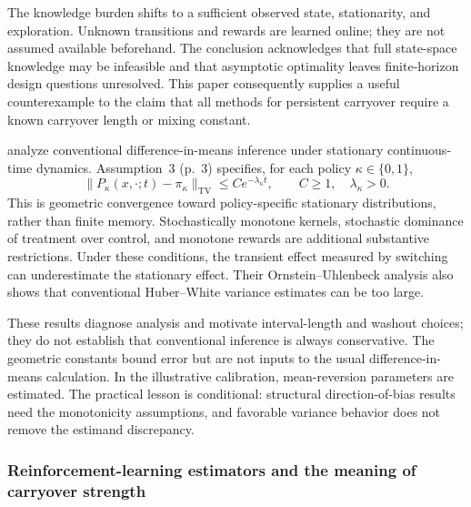 \documentclass[12pt]{article}
\begin{document}
The knowledge burden shifts to a sufficient observed state, stationarity, and exploration. Unknown transitions and rewards are learned online; they are not assumed available beforehand. The conclusion acknowledges that full state-space knowledge may be infeasible and that asymptotic optimality leaves finite-horizon design questions unresolved. This paper consequently supplies a useful counterexample to the claim that all methods for persistent carryover require a known carryover length or mixing constant.

\citet{blanchet2026} analyze conventional difference-in-means inference under stationary continuous-time dynamics. Assumption~3 (p.~3) specifies, for each policy $\kappa\in\{0,1\}$,
\begin{equation}
 \lVert P_\kappa(x,\cdot;t)-\pi_\kappa\rVert_{\mathrm{TV}}
 \leq C e^{-\lambda_\kappa t},
 \qquad C\geq1,\quad \lambda_\kappa>0.
\end{equation}
This is geometric convergence toward policy-specific stationary distributions, rather than finite memory. Stochastically monotone kernels, stochastic dominance of treatment over control, and monotone rewards are additional substantive restrictions. Under these conditions, the transient effect measured by switching can underestimate the stationary effect. Their Ornstein--Uhlenbeck analysis also shows that conventional Huber--White variance estimates can be too large.

These results diagnose analysis and motivate interval-length and washout choices; they do not establish that conventional inference is always conservative. The geometric constants bound error but are not inputs to the usual difference-in-means calculation. In the illustrative calibration, mean-reversion parameters are estimated. The practical lesson is conditional: structural direction-of-bias results need the monotonicity assumptions, and favorable variance behavior does not remove the estimand discrepancy.

\subsubsection{Reinforcement-learning estimators and the meaning of carryover strength}
\end{document}
